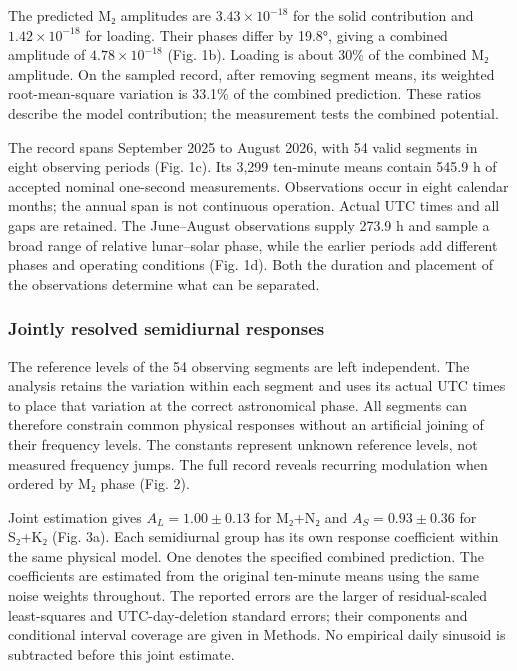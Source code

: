 \documentclass[
  12pt,
  a4paper,
]{article}
\begin{document}
The predicted M₂ amplitudes are \(3.43\times10^{-18}\) for the solid
contribution and \(1.42\times10^{-18}\) for loading. Their phases differ
by 19.8°, giving a combined amplitude of \(4.78\times10^{-18}\) (Fig.
1b). Loading is about 30\% of the combined M₂ amplitude. On the sampled
record, after removing segment means, its weighted root-mean-square
variation is 33.1\% of the combined prediction. These ratios describe
the model contribution; the measurement tests the combined potential.

The record spans September 2025 to August 2026, with 54 valid segments
in eight observing periods (Fig. 1c). Its 3,299 ten-minute means contain
545.9 h of accepted nominal one-second measurements. Observations occur
in eight calendar months; the annual span is not continuous operation.
Actual UTC times and all gaps are retained. The June--August
observations supply 273.9 h and sample a broad range of relative
lunar--solar phase, while the earlier periods add different phases and
operating conditions (Fig. 1d). Both the duration and placement of the
observations determine what can be separated.

\hypertarget{jointly-resolved-semidiurnal-responses}{%
\subsubsection{Jointly resolved semidiurnal
responses}\label{jointly-resolved-semidiurnal-responses}}

The reference levels of the 54 observing segments are left independent.
The analysis retains the variation within each segment and uses its
actual UTC times to place that variation at the correct astronomical
phase. All segments can therefore constrain common physical responses
without an artificial joining of their frequency levels. The constants
represent unknown reference levels, not measured frequency jumps. The
full record reveals recurring modulation when ordered by M₂ phase (Fig.
2).

Joint estimation gives \(A_L=1.00\pm0.13\) for M₂+N₂ and
\(A_S=0.93\pm0.36\) for S₂+K₂ (Fig. 3a). Each semidiurnal group has its
own response coefficient within the same physical model. One denotes the
specified combined prediction. The coefficients are estimated from the
original ten-minute means using the same noise weights throughout. The
reported errors are the larger of residual-scaled least-squares and
UTC-day-deletion standard errors; their components and conditional
interval coverage are given in Methods. No empirical daily sinusoid is
subtracted before this joint estimate.
\end{document}
